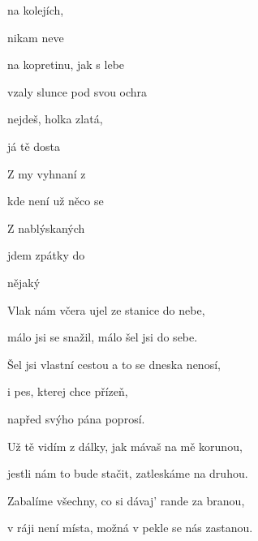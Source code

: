 

\zs
{} na kolejích,

 nikam neve  

 na kopretinu, jak  s lebe

 vzaly slunce  pod svou ochra 

 nejdeš, holka zlatá,

 já tě dosta 
\ks

\zr
Z  my vyhnaní z 

kde není už   něco se  

Z  nablýskaných 

jdem zpátky do 

 nějaký  
\kr

\zs
Vlak nám včera ujel ze stanice do nebe,

málo jsi se snažil, málo šel jsi do sebe.

Šel jsi vlastní cestou a to se dneska nenosí,

i pes, kterej chce přízeň,

napřed svýho pána poprosí.
\ks

\zs
Už tě vidím z dálky, jak mávaš na mě korunou,

jestli nám to bude stačit, zatleskáme na druhou.

Zabalíme všechny, co si dávaj' rande za branou,

v ráji není místa, možná v pekle se nás zastanou.
\ks

\kp
